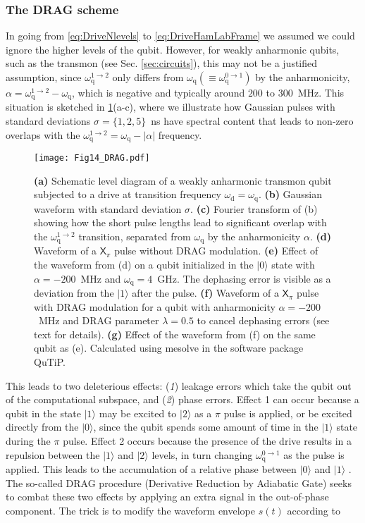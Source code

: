 \documentclass[aip,apr,twocolumn,showpacs,superscriptaddress,groupedaddress,nofootinbib,reprint]{revtex4-1}  %
\newcommand{\X}[1]{\textsf{X}_{#1}}
\newcommand{\freq}{\omega_\text{q}}
\renewcommand{\d}{\text{d}}
\begin{document}
\subsubsection{\label{sec:DRAG}The DRAG scheme}
In going from \cref{eq:DriveNlevels} to \cref{eq:DriveHamLabFrame} we assumed we could ignore the higher levels of the qubit. However, for weakly anharmonic qubits, such as the transmon (see Sec. \ref{sec:circuits}), this may not be a justified assumption, since $\omega^{1\rightarrow 2}_\text{q}$ only differs from $\omega_\text{q} (\equiv \omega_\text{q}^{0\rightarrow 1})$ by the anharmonicity, $\alpha = \omega^{1\rightarrow 2}_\text{q} - \omega_\text{q}$, which is negative and typically around $200$ to $300$~MHz. This situation is sketched in \cref{fig:DRAG}(a-c), where we illustrate how Gaussian pulses with standard deviations $\sigma = \{1,2,5\}$~ns have spectral content that leads to non-zero overlaps with the $\omega^{1\rightarrow2}_\text{q} = \omega_\text{q}-|\alpha|$ frequency.
\begin{figure}[!t]
\begin{center}
\texttt{[image: Fig14\_DRAG.pdf]}
\caption{\textbf{(a)} Schematic level diagram of a weakly anharmonic transmon qubit subjected to a drive at transition frequency $\omega_\d = \freq$. \textbf{(b)} Gaussian waveform with standard deviation $\sigma$. \textbf{(c)} Fourier transform of (b) showing how the short pulse lengths lead to significant overlap with the $\omega_\text{q}^{1\rightarrow2}$ transition, separated from $\omega_\text{q}$ by the anharmonicity $\alpha$. \textbf{(d)} Waveform of a $\X{\pi}$ pulse without DRAG modulation. \textbf{(e)} Effect of the waveform from (d) on a qubit initialized in the $|0\rangle$ state with $\alpha = -200$~MHz and $\omega_\text{q} = 4$~GHz. The dephasing error is visible as a deviation from the $|1\rangle$ after the pulse. \textbf{(f)} Waveform of a $\X{\pi}$ pulse with DRAG modulation for a qubit with anharmonicity $\alpha = -200$~MHz and DRAG parameter $\lambda = 0.5$ to cancel dephasing errors (see text for details). \textbf{(g)} Effect of the waveform from (f) on the same qubit as (e). Calculated using \textsf{mesolve} in the software package \textsf{QuTiP}\cite{Johansson2013}.}
\label{fig:DRAG}
\end{center}
\end{figure}
This leads to two deleterious effects: (\emph{1}) leakage errors which take the qubit out of the computational subspace, and (\emph{2}) phase errors. Effect 1 can occur because a qubit in the state $|1\rangle$ may be excited to $|2\rangle$ as a $\pi$ pulse is applied, or be excited directly from the $|0\rangle$, since the qubit spends some amount of time in the $|1\rangle$ state during the $\pi$ pulse. Effect 2 occurs because the presence of the drive results in a repulsion between the $|1\rangle$ and $|2\rangle$ levels, in turn changing $\omega_\text{q}^{0\rightarrow 1}$ as the pulse is applied. This leads to the accumulation of a relative phase between $|0\rangle$ and $|1\rangle$ \cite{ChenPhD2018}. The so-called DRAG procedure\cite{Motzoi2009,Gambetta2011,De2015} (Derivative Reduction by Adiabatic Gate) seeks to combat these two effects by applying an extra signal in the out-of-phase component. The trick is to modify the waveform envelope $s(t)$ according to
\end{document}
